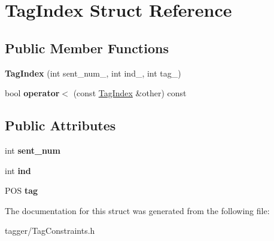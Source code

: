 \hypertarget{structTagIndex}{
\section{TagIndex Struct Reference}
\label{structTagIndex}
}
\subsection*{Public Member Functions}
\begin{DoxyCompactItemize}
\item 
\hypertarget{structTagIndex_a30a1bf326d593304ac3d950fd2b8be92}{
{\bfseries TagIndex} (int sent\_\-num\_\-, int ind\_\-, int tag\_\-)}
\label{structTagIndex_a30a1bf326d593304ac3d950fd2b8be92}

\item 
\hypertarget{structTagIndex_a7b858bbf2ed8ed6bb56d87db8d38aaf2}{
bool {\bfseries operator$<$} (const \hyperlink{structTagIndex}{TagIndex} \&other) const }
\label{structTagIndex_a7b858bbf2ed8ed6bb56d87db8d38aaf2}

\end{DoxyCompactItemize}
\subsection*{Public Attributes}
\begin{DoxyCompactItemize}
\item 
\hypertarget{structTagIndex_a9bde045f6de7e99933920b883af894dc}{
int {\bfseries sent\_\-num}}
\label{structTagIndex_a9bde045f6de7e99933920b883af894dc}

\item 
\hypertarget{structTagIndex_ac9cd159e647314e5beaf7af6da56fa6e}{
int {\bfseries ind}}
\label{structTagIndex_ac9cd159e647314e5beaf7af6da56fa6e}

\item 
\hypertarget{structTagIndex_a1182f316658b96f36ecd7689d790f508}{
POS {\bfseries tag}}
\label{structTagIndex_a1182f316658b96f36ecd7689d790f508}

\end{DoxyCompactItemize}


The documentation for this struct was generated from the following file:\begin{DoxyCompactItemize}
\item 
tagger/TagConstraints.h\end{DoxyCompactItemize}

